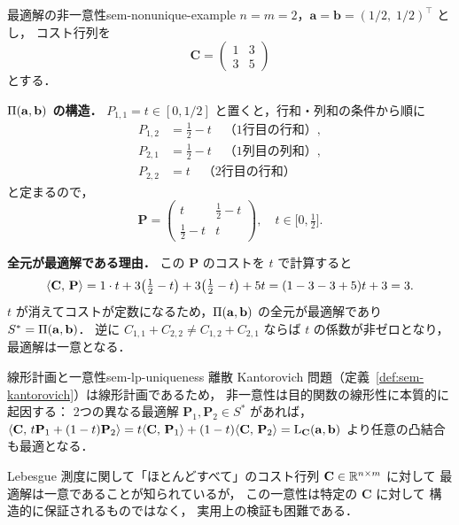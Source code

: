 \begin{example}{最適解の非一意性}{sem-nonunique-example}
  $n = m = 2$，$\mathbf{a} = \mathbf{b} = (1/2,\; 1/2)^\top$ とし，
  コスト行列を
  \[
    \mathbf{C} = \begin{pmatrix} 1 & 3 \\ 3 & 5 \end{pmatrix}
  \]
  とする．

  \textbf{$\Pi(\mathbf{a},\mathbf{b})$ の構造．}
  $P_{1,1} = t \in [0, 1/2]$ と置くと，行和・列和の条件から順に
  \begin{align*}
    P_{1,2} &= \tfrac{1}{2} - t \quad \text{（1行目の行和）},\\
    P_{2,1} &= \tfrac{1}{2} - t \quad \text{（1列目の列和）},\\
    P_{2,2} &= t              \quad \text{（2行目の行和）}
  \end{align*}
  と定まるので，
  \[
    \mathbf{P} = \begin{pmatrix} t & \tfrac{1}{2}-t \\ \tfrac{1}{2}-t & t \end{pmatrix}, \quad t \in \bigl[0,\tfrac{1}{2}\bigr].
  \]

  \textbf{全元が最適解である理由．}
  この $\mathbf{P}$ のコストを $t$ で計算すると
  \[
    \langle \mathbf{C},\, \mathbf{P} \rangle
    = 1 \cdot t + 3\!\left(\tfrac{1}{2}-t\right) + 3\!\left(\tfrac{1}{2}-t\right) + 5t
    = (1 - 3 - 3 + 5)t + 3 = 3.
  \]
  $t$ が消えてコストが定数になるため，$\Pi(\mathbf{a},\mathbf{b})$ の全元が最適解であり
  $S^* = \Pi(\mathbf{a},\mathbf{b})$．
  逆に $C_{1,1} + C_{2,2} \neq C_{1,2} + C_{2,1}$ ならば $t$ の係数が非ゼロとなり，最適解は一意となる．
\end{example}

\begin{remark}{線形計画と一意性}{sem-lp-uniqueness}
  離散 Kantorovich 問題（定義~\ref{def:sem-kantorovich}）は線形計画であるため，
  非一意性は目的関数の線形性に本質的に起因する：
  2つの異なる最適解 $\mathbf{P}_1, \mathbf{P}_2 \in S^*$ があれば，
  $\langle \mathbf{C},\, t\mathbf{P}_1 + (1-t)\mathbf{P}_2 \rangle
  = t\langle \mathbf{C},\, \mathbf{P}_1 \rangle + (1-t)\langle \mathbf{C},\, \mathbf{P}_2 \rangle
  = \mathrm{L}_{\mathbf{C}}(\mathbf{a},\mathbf{b})$
  より任意の凸結合も最適となる．

  Lebesgue 測度に関して「ほとんどすべて」のコスト行列
  $\mathbf{C} \in \mathbb{R}^{n \times m}$ に対して
  最適解は一意であることが知られているが，
  この一意性は特定の $\mathbf{C}$ に対して
  構造的に保証されるものではなく，
  実用上の検証も困難である．
\end{remark}

